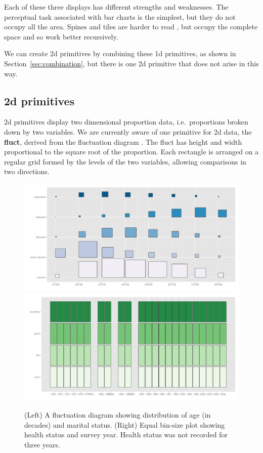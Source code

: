 \documentclass[journal]{vgtc}
\begin{document}
Each of these three displays has different strengths and weaknesses. The perceptual task associated with bar charts is the simplest, but they do not occupy all the area. Spines and tiles are harder to read \citep{heer:2010}, but occupy the complete space and so work better recursively.

We can create 2d primitives by combining these 1d primitives, as shown in Section~\ref{sec:combination}, but there is one 2d primitive that does not arise in this way.

\subsection{2d primitives}
\label{sub:part-2d}

2d primitives display two dimensional proportion data, i.e.\ proportions broken down by two variables. We are currently aware of one primitive for 2d data, the {\bf fluct}, derived from the fluctuation diagram \citep{hofmann:2000}. The fluct has height and width proportional to the square root of the proportion. Each rectangle is arranged on a regular grid formed by the levels of the two variables, allowing comparisons in two directions. 

\begin{figure}[htbp]
  \centering
    \includegraphics[width=0.9 \linewidth]{part-fluct}
    \includegraphics[width=0.9 \linewidth]{part-fluct-cond}
  \caption{(Left) A fluctuation diagram showing distribution of age (in decades) and marital status. (Right) Equal bin-size plot showing health status and survey year. Health status was not recorded for three years.}
  \label{fig:fluct}
\end{figure}
\end{document}
